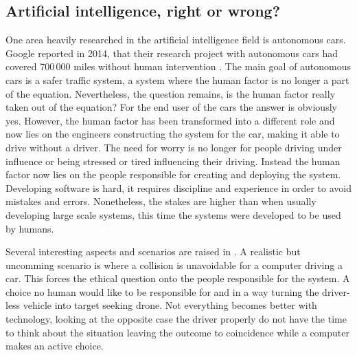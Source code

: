 \subsection{Artificial intelligence, right or wrong?}
\label{sec:hawkins}

One area heavily researched in the artificial intelligence field is 
autonomous cars. Google reported in 2014, that their research project with
autonomous cars had covered 700\,000 miles without human intervention
\parencite{Urmson2014:Online}. The main goal of autonomous cars is a safer
traffic system, a system where the human factor is no longer a part of the
equation. Nevertheless, the question remains, is the human factor really taken
out of the equation? For the end user of the cars the answer is obviously yes.
However, the human factor has been transformed into a different role and now
lies on the engineers constructing the system for the car, making it able to
drive without a driver. The need for worry is no longer for people driving
under influence or being stressed or tired influencing their driving. Instead
the human factor now lies on the people responsible for creating and deploying
the system. Developing software is hard, it requires discipline and experience
in order to avoid mistakes and errors. Nonetheless, the stakes are higher
than when usually developing large scale systems, this time the systems were
developed to be used by humans.

Several interesting aspects and scenarios are raised in \textcite{Lin:Online}.
A realistic but uncomming scenario is where a collision is unavoidable for a
computer driving a car. This forces the ethical question onto the people
responsible for the system. A choice no human would like to be responsible for
and in a way turning the driver-less vehicle into target seeking drone. Not
everything becomes better with technology, looking at the opposite case the
driver properly do not have the time to think about the situation leaving the
outcome to coincidence while a computer makes an active choice.
